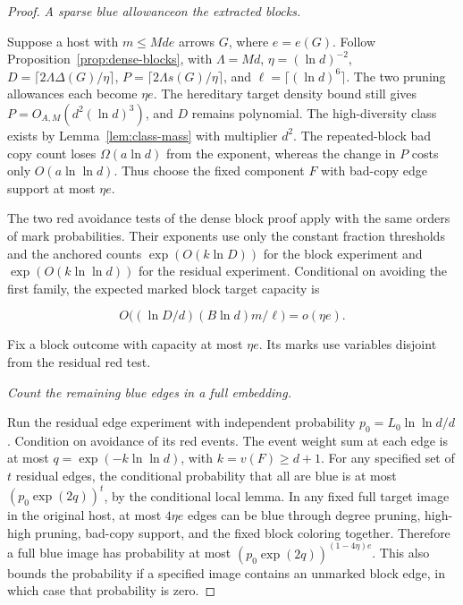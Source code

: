 \documentclass[11pt]{amsart}
\theoremstyle{definition}
\theoremstyle{remark}
\numberwithin{equation}{section}
\begin{document}
\begin{proof}

\medskip\noindent\emph{A sparse blue allowanceon the extracted blocks.}

Suppose a host with $m\le Md e $ arrows $ G $, where $ e=e(G)$. Follow Proposition~\ref{prop:dense-blocks}, with $\Lambda=Md $, $\eta=(\ln d)^{-2}$, $ D=\lceil2\Lambda\Delta(G)/\eta\rceil $, $ P=\lceil2\Lambda s(G)/\eta\rceil $, and $\ell=\lceil(\ln d)^6\rceil $. The two pruning allowances each become $\eta e $. The hereditary target density bound still gives $ P=O_{A,M}(d^2(\ln d)^3)$, and $ D $ remains polynomial. The high-diversity class exists by Lemma~\ref{lem:class-mass} with multiplier $ d^2$. The repeated-block bad copy count loses $\Omega(a\ln d)$ from the exponent, whereas the change in $ P $ costs only $ O(a\ln\ln d)$. Thus choose the fixed component $ F $ with bad-copy edge support at most $\eta e$.

The two red avoidance tests of the dense block proof apply with the same orders of mark probabilities. Their exponents use only the constant fraction thresholds and the anchored counts $\exp(O(k\ln D))$ for the block experiment and $\exp(O(k\ln\ln d))$ for the residual experiment. Conditional on avoiding the first family, the expected marked block target capacity is

\begin{equation}
O\bigl((\ln D/d)(B\ln d)m/\ell\bigr)=o(\eta e).
\end{equation}

Fix a block outcome with capacity at most $\eta e$. Its marks use variables disjoint from the residual red test.

\medskip\noindent\emph{Count the remaining blue edges in a full embedding.}

Run the residual edge experiment with independent probability $p_0=L_0\ln\ln d/d $. Condition on avoidance of its red events. The event weight sum at each edge is at most $ q=\exp(-k\ln\ln d)$, with $ k=v(F)\ge d+1$. For any specified set of $ t $ residual edges, the conditional probability that all are blue is at most $(p_0\exp(2q))^t $, by the conditional local lemma. In any fixed full target image in the original host, at most $4\eta e $ edges can be blue through degree pruning, high-high pruning, bad-copy support, and the fixed block coloring together. Therefore a full blue image has probability at most $(p_0\exp(2q))^{(1-4\eta)e}$. This also bounds the probability if a specified image contains an unmarked block edge, in which case that probability is zero.


\end{proof}
\end{document}
